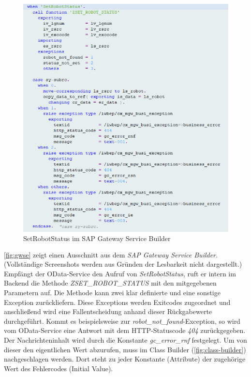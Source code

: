 \begin{figure}[!ht]
	\centering
	\includegraphics[width=\textwidth]{Bilder/ABAP/2020-12-04 10_20_43-Class Builder Class ZCL_ZEWM_ROBCO_DPC_EXT Display_cut.png}
	\caption{SetRobotStatus im SAP Gateway Service Builder}
	\label{fig:gwse}
\end{figure}

\autoref{fig:gwse} zeigt einen Ausschnitt aus dem \emph{SAP Gateway Service Builder}.
(Vollständige Screenshots werden aus Gründen der Lesbarkeit nicht dargestellt.)
Empfängt der OData-Service den Aufruf von \emph{SetRobotStatus}, ruft er intern im Backend die Methode \emph{ZSET\_ROBOT\_STATUS} mit den mitgegebenen Parametern auf.
Die Methode kann zwei klar definierte und eine sonstige Exception zurückliefern.
Diese Exceptions werden Exitcodes zugeordnet und anschließend wird eine Fallentscheidung anhand dieser Rückgabewerte durchgeführt.
Kommt es beispielsweise zur \emph{robot\_not\_found}-Exception, so wird vom OData-Service eine Antwort mit dem \ac{HTTP}-Statuscode \emph{404} zurückgegeben.
Der Nachrichteninhalt wird durch die Konstante \emph{gc\_error\_rnf} festgelegt.
Um von dieser den eigentlichen Wert abzurufen, muss im Class Builder (\autoref{fig:class-builder}) nachgeschlagen werden.
Dort steht zu jeder Konstante (Attribute) der zugehörige Wert des Fehlercodes (Initial Value).


